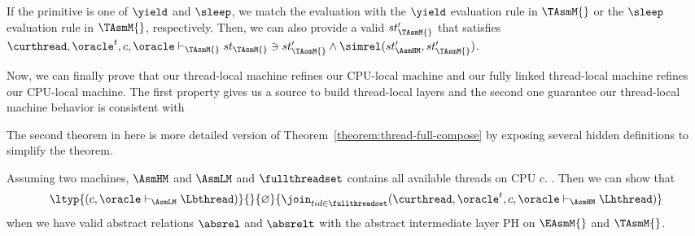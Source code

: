 If the primitive is one of $\yield$ and $\sleep$, we match the evaluation with the $\yield$ evaluation rule in $\TAsmM{}$ or 
the $\sleep$ evaluation rule in $\TAsmM{}$, respectively.
Then, we can also provide a valid $st'_{\TAsmM{}}$ that satisfies $\curthread, \oracle^{t}, c, \oracle \vdash_{\TAsmM{}} st_{\TAsmM{}} \ni st'_{\TAsmM{}} \wedge \simrel(st'_{\AsmHM}, st'_{\TAsmM{}})$.

Now, we can finally prove that our thread-local machine refines our CPU-local machine and our fully linked thread-local machine refines our 
CPU-local machine. 
The first property gives us a source to build thread-local layers and the second one guarantee our thread-local machine behavior is consistent with 

The second theorem in here is more detailed version of Theorem~\ref{theorem:thread-full-compose} by exposing several hidden definitions to simplify the theorem. 

\begin{theorem}
\begin{small}
Assuming two machines, $\AsmHM$ and $\AsmLM$ and $\fullthreadset$ contains all available threads on CPU $c$.
. Then we can show that
$$\ltyp{(c, \oracle \vdash_{\AsmLM} \Lbthread)}
{}
{\varnothing}{\join_{tid \in \fullthreadset} (\curthread, \oracle^{t}, c, \oracle \vdash_{\AsmHM} \Lhthread)}$$
when we have valid abstract relations $\absrel$ and $\absrelt$ with the abstract intermediate 
layer $\mathrm{PH}$ on $\EAsmM{}$ and $\TAsmM{}$.
\end{small}
\label{theorem:tasm_refines_lasm}
\end{theorem}%

